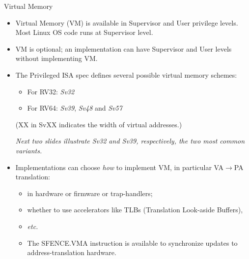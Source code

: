 \documentclass{article}
\newcommand{\etc}{\emph{etc.}}
\begin{document}
\clearpage


\begin{center}
  {\Huge
    Virtual Memory}

  \vspace*{1in}

  \begin{minipage}[t]{10in}
    \begin{itemize}\LARGE
 
    \item Virtual Memory (VM) is available in Supervisor and User privilege
      levels. \\
      Most Linux OS code runs at Supervisor level.

    \item VM is optional; an implementation can have Supervisor and
      User levels without implementing VM.

    \item The Privileged ISA spec defines several possible virtual memory schemes:
      \begin{itemize}
        \item For RV32: \emph{Sv32}
        \item For RV64: \emph{Sv39}, \emph{Sv48} and \emph{Sv57}
      \end{itemize}

      {\large
      (XX in SvXX indicates the width of virtual addresses.)

      \emph{Next two slides illustrate Sv32 and Sv39,
      respectively, the two most common variants.}}

    \item Implementations can choose \emph{how} to implement VM, in
      particular VA$\rightarrow$PA translation:

      \begin{itemize}
      \item in hardware or firmware or trap-handlers;
      \item whether to use accelerators like TLBs (Translation Look-aside Buffers),
      \item {\etc}
        \vspace{2ex}

      \item The SFENCE.VMA instruction is available to synchronize updates to
        address-translation hardware.
      \end{itemize}

    \end{itemize}
  \end{minipage}
\end{center}
\end{document}
